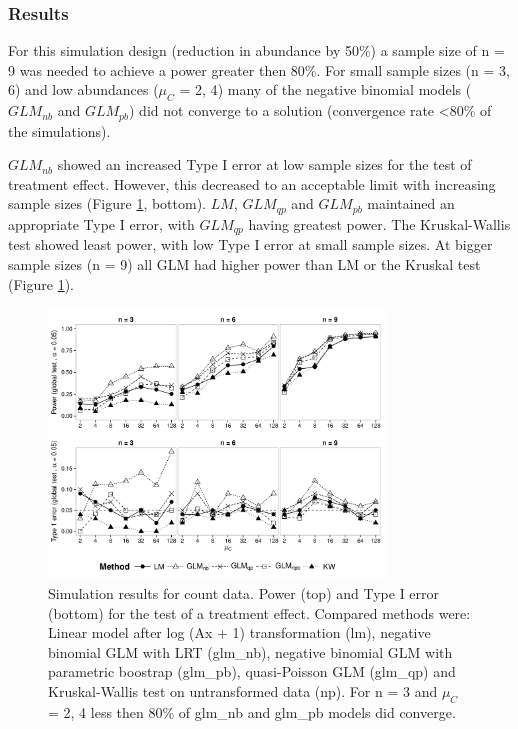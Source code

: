 \documentclass{scrartcl}
\begin{document}
\subsubsection{Results}
For this simulation design (reduction in abundance by 50\%) a sample size of n = 9 was needed to achieve a power greater then 80\%.
For small sample sizes (n = {3, 6}) and low abundances ($\mu_C$ = {2, 4}) many of the negative binomial models ($GLM_{nb}$ and $GLM_{pb}$) did not converge to a solution (convergence rate \textless 80\% of the simulations). 

$GLM_{nb}$ showed an increased Type I error at low sample sizes for the test of treatment effect. 
However, this decreased to an acceptable limit with increasing sample sizes (Figure \ref{fig:p_glob_c}, bottom).
$LM$, $GLM_{qp}$ and $GLM_{pb}$ maintained an appropriate Type I error, with $GLM_{qp}$ having greatest power.
The Kruskal-Wallis test showed least power, with low Type I error at small sample sizes. 
At bigger sample sizes (n = 9) all GLM had higher power than LM or the Kruskal test (Figure \ref{fig:p_glob_c}). 

\begin{figure}[h]
  \centering
  \includegraphics[width = 0.8\textwidth]{p_glob_c.pdf}
  \caption{Simulation results for count data. Power (top) and Type I error (bottom) for the test of a treatment effect. Compared methods were: Linear model after log (Ax + 1) transformation (lm), negative binomial GLM with LRT (glm\_nb), negative binomial GLM with parametric boostrap (glm\_pb), quasi-Poisson GLM (glm\_qp) and Kruskal-Wallis test on untransformed data (np).
  For n = 3 and $\mu_C$ = {2, 4} less then 80\% of glm\_nb and glm\_pb models did converge.}
  \label{fig:p_glob_c}
\end{figure}
\end{document}
